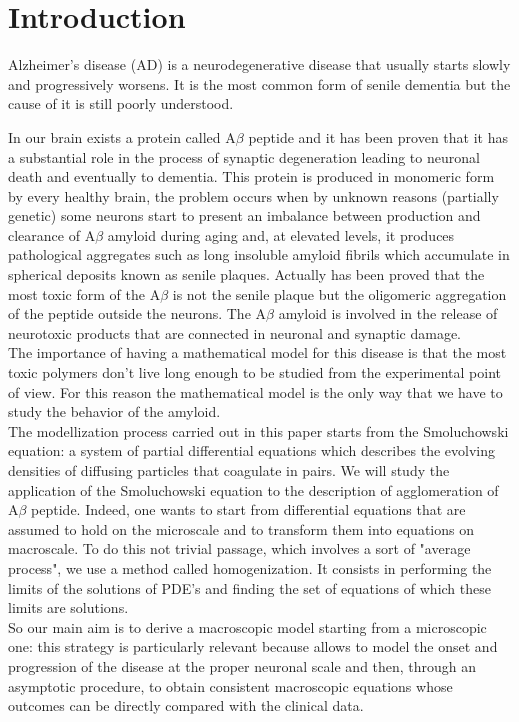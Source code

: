 \documentclass{article}
\newcommand{\incfig}[1]{%
    \def\svgwidth{\columnwidth}
    {#1.pdf_tex}
}
\def\ba{$\mathrm{A} \beta$ }
\theoremstyle{definition}
\theoremstyle{remark}
\begin{document}
\section{Introduction}
Alzheimer's disease (AD) is a neurodegenerative disease that usually starts slowly and progressively worsens. It is the most common form of senile dementia but the cause of it is still poorly understood. \\
\begin{figure}[H]
  \scalebox{.3}{\incfig{drawing}}
  \label{fig:riemmans-theorem}
\end{figure}
In our brain exists a protein called \ba{} peptide and it has been proven that it has a substantial role in the process of synaptic degeneration leading to neuronal death and eventually to dementia. This protein is produced in monomeric form by every healthy brain, the problem occurs when  by unknown reasons (partially genetic) some neurons start to present an imbalance between production and clearance of $\mathrm{A} \beta$ amyloid during aging and, at elevated levels, it produces pathological aggregates such as long insoluble amyloid fibrils which accumulate in spherical deposits known as senile plaques. Actually has been proved that the most toxic form of the \ba is not the senile plaque but the oligomeric aggregation of the peptide outside the neurons. The $\mathrm{A} \beta$ amyloid is involved in the release of neurotoxic products that are connected in neuronal and synaptic damage. \\
The importance of having a mathematical model for this disease is that the most toxic polymers don't live long enough to be studied from the experimental point of view. For this reason the mathematical model is the only way that we have to study the behavior of the amyloid.\\
The modellization process carried out in this paper starts from the Smoluchowski equation: a system of partial differential equations which describes the evolving densities of diffusing particles that coagulate in pairs. We will study the application of the Smoluchowski equation to the description of agglomeration of $\mathrm{A} \beta$ peptide. Indeed, one wants to start from differential equations that are assumed to hold on the microscale and to transform them into equations on macroscale. To do this not trivial passage, which involves a sort of "average process", we use a method called homogenization. It consists in performing the limits of the solutions of PDE's and finding the set of equations of which these limits are solutions. \\
So our main aim is to derive a macroscopic model starting from a microscopic one: this strategy is particularly relevant because allows to model the onset and progression of the disease at the proper neuronal scale and then, through an asymptotic procedure, to obtain consistent macroscopic equations whose outcomes can be directly compared with the clinical data.
\end{document}
